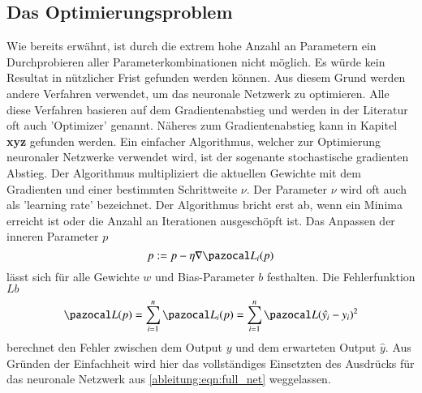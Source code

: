 \subsection{Das Optimierungsproblem}
Wie bereits erwähnt, ist durch die extrem hohe Anzahl an Parametern ein Durchprobieren aller Parameterkombinationen nicht möglich.
Es würde kein Resultat in nützlicher Frist gefunden werden können.
Aus diesem Grund werden andere Verfahren verwendet, um das neuronale Netzwerk zu optimieren.
Alle diese Verfahren basieren auf dem Gradientenabstieg und werden in der Literatur oft auch 'Optimizer' genannt. Näheres zum Gradientenabstieg kann in Kapitel \textbf{xyz} gefunden werden.
Ein einfacher Algorithmus, welcher zur Optimierung neuronaler Netzwerke verwendet wird, ist der sogenante stochastische gradienten Abstieg.
Der Algorithmus multipliziert die aktuellen Gewichte mit dem Gradienten und einer bestimmten Schrittweite $\nu$. 
Der Parameter $\nu$ wird oft auch als 'learning rate' bezeichnet.
Der Algorithmus bricht erst ab, wenn ein Minima erreicht ist oder die Anzahl an Iterationen ausgeschöpft ist.
Das Anpassen der inneren Parameter $p$ 
\begin{equation}
p:=p-\eta \nabla \Lb_{i}(p)
\end{equation}
lässt sich für alle Gewichte $w$ und Bias-Parameter $b$ festhalten.
Die Fehlerfunktion $Lb$
\begin{equation}
\Lb(p)=\sum_{i=1}^{n}\Lb_{i}(p)=\sum_{i=1}^{n}\Lb(\hat{y_i}-y_i)^2
\end{equation}
berechnet den Fehler zwischen dem Output $y$ und dem erwarteten Output $\hat{y}$. Aus Gründen der Einfachheit wird hier das vollständiges Einsetzten des Ausdrücks für das neuronale Netzwerk aus \eqref{ableitung:eqn:full_net} weggelassen.

